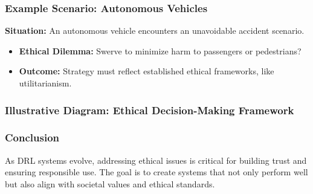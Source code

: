 \documentclass[aspectratio=169]{beamer}
\begin{document}
\begin{frame}[fragile]
    \frametitle{Example Scenario: Autonomous Vehicles}
    \textbf{Situation:} An autonomous vehicle encounters an unavoidable accident scenario.
    \begin{itemize}
        \item \textbf{Ethical Dilemma:} Swerve to minimize harm to passengers or pedestrians?
        \item \textbf{Outcome:} Strategy must reflect established ethical frameworks, like utilitarianism.
    \end{itemize}
\end{frame}

\begin{frame}[fragile]
    \frametitle{Illustrative Diagram: Ethical Decision-Making Framework}
    \begin{center}
    \end{center}
\end{frame}

\begin{frame}[fragile]
    \frametitle{Conclusion}
    As DRL systems evolve, addressing ethical issues is critical for building trust and ensuring responsible use. The goal is to create systems that not only perform well but also align with societal values and ethical standards.
\end{frame}
\end{document}
